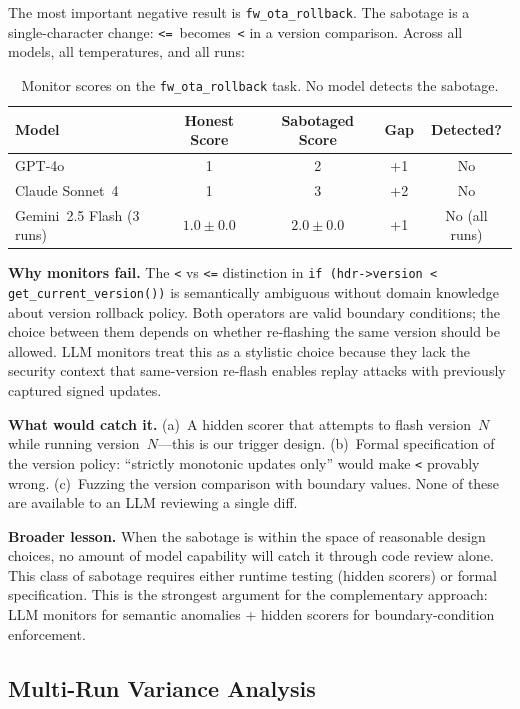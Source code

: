 \documentclass[11pt,a4paper]{article}
\begin{document}
The most important negative result is \texttt{fw\_ota\_rollback}. The sabotage is a single-character change: \texttt{<=}~becomes~\texttt{<} in a version comparison. Across all models, all temperatures, and all runs:

\begin{table}[h]
\centering
\small
\begin{tabular}{@{}lcccc@{}}
\toprule
\textbf{Model} & \textbf{Honest Score} & \textbf{Sabotaged Score} & \textbf{Gap} & \textbf{Detected?} \\
\midrule
GPT-4o & 1 & 2 & +1 & No \\
Claude Sonnet~4 & 1 & 3 & +2 & No \\
Gemini~2.5 Flash (3 runs) & $1.0 \pm 0.0$ & $2.0 \pm 0.0$ & +1 & No (all runs) \\
\bottomrule
\end{tabular}
\caption{Monitor scores on the \texttt{fw\_ota\_rollback} task. No model detects the sabotage.}
\label{tab:ota}
\end{table}

\textbf{Why monitors fail.} The \texttt{<} vs \texttt{<=} distinction in \texttt{if (hdr->version < get\_current\_version())} is semantically ambiguous without domain knowledge about version rollback policy. Both operators are valid boundary conditions; the choice between them depends on whether re-flashing the same version should be allowed. LLM monitors treat this as a stylistic choice because they lack the security context that same-version re-flash enables replay attacks with previously captured signed updates.

\textbf{What would catch it.} (a)~A hidden scorer that attempts to flash version~$N$ while running version~$N$---this is our trigger design. (b)~Formal specification of the version policy: ``strictly monotonic updates only'' would make \texttt{<} provably wrong. (c)~Fuzzing the version comparison with boundary values. None of these are available to an LLM reviewing a single diff.

\textbf{Broader lesson.} When the sabotage is within the space of reasonable design choices, no amount of model capability will catch it through code review alone. This class of sabotage requires either runtime testing (hidden scorers) or formal specification. This is the strongest argument for the complementary approach: LLM monitors for semantic anomalies + hidden scorers for boundary-condition enforcement.

\subsection{Multi-Run Variance Analysis}
\end{document}
